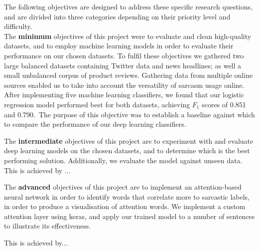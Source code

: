 \documentclass[12pt,a4paper]{article}
\begin{document}
\noindent The following objectives are designed to address these specific research questions, and are divided into three categories depending on their priority level and difficulty.\\

\noindent The \textbf{minimum} objectives of this project were to evaluate and clean high-quality datasets, and to employ machine learning models in order to evaluate their performance on our chosen datasets. To fulfil these objectives we gathered two large balanced datasets containing Twitter data and news headlines; as well a small unbalanced corpus of product reviews. Gathering data from multiple online sources enabled us to take into account the versatility of sarcasm usage online. After implementing five machine learning classifiers, we found that our logistic regression model performed best for both datasets, achieving  $F_{1}$ scores of 0.851 and 0.790.\ The purpose of this objective was to establish a baseline against which to compare the performance of our deep learning classifiers.

The \textbf{intermediate} objectives of this project are to experiment with and evaluate deep learning models on the chosen datasets, and to determine which is the best performing solution. Additionally, we evaluate the model against unseen data. This is achieved by ...

The \textbf{advanced} objectives of this project are to implement an attention-based neural network in order to identify words that correlate more to sarcastic labels, in order to produce a visualisation of attention words. We implement a custom attention layer using keras, and apply our trained model to a number of sentences to illustrate its effectiveness.

This is achieved by...




\end{document}
